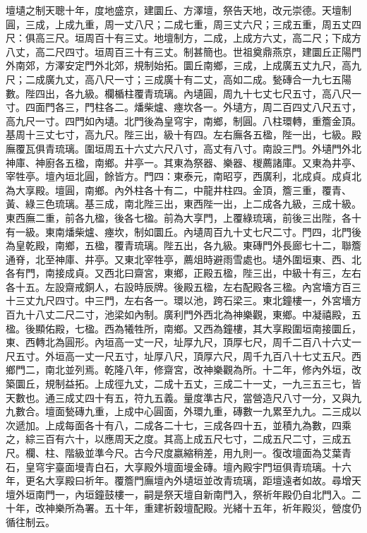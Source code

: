\begin{pinyinscope}
壇壝之制天聰十年，度地盛京，建圜丘、方澤壇，祭告天地，改元崇德。天壇制圓，三成，上成九重，周一丈八尺；二成七重，周三丈六尺；三成五重，周五丈四尺：俱高三尺。垣周百十有三丈。地壇制方，二成，上成方六丈，高二尺；下成方八丈，高二尺四寸。垣周百三十有三丈。制甚簡也。世祖奠鼎燕京，建圜丘正陽門外南郊，方澤安定門外北郊，規制始拓。圜丘南鄉，三成，上成廣五丈九尺，高九尺；二成廣九丈，高八尺一寸；三成廣十有二丈，高如二成。甃磚合一九七五陽數。陛四出，各九級。欄楯柱覆青琉璃。內壝圓，周九十七丈七尺五寸，高八尺一寸。四面門各三，門柱各二。燔柴爐、瘞坎各一。外壝方，周二百四丈八尺五寸，高九尺一寸。四門如內壝。北門後為皇穹宇，南鄉，制圓。八柱環轉，重簷金頂。基周十三丈七寸，高九尺。陛三出，級十有四。左右廡各五楹，陛一出，七級。殿廡覆瓦俱青琉璃。圍垣周五十六丈六尺八寸，高丈有八寸。南設三門。外壝門外北神庫、神廚各五楹，南鄉。井亭一。其東為祭器、樂器、椶薦諸庫。又東為井亭、宰牲亭。壇內垣北圓，餘皆方。門四：東泰元，南昭亨，西廣利，北成貞。成貞北為大享殿。壇圓，南鄉。內外柱各十有二，中龍井柱四。金頂，簷三重，覆青、黃、綠三色琉璃。基三成，南北陛三出，東西陛一出，上二成各九級，三成十級。東西廡二重，前各九楹，後各七楹。前為大享門，上覆綠琉璃，前後三出陛，各十有一級。東南燔柴爐、瘞坎，制如圜丘。內壝周百九十丈七尺二寸。門四，北門後為皇乾殿，南鄉，五楹，覆青琉璃。陛五出，各九級。東磚門外長廊七十二，聯簷通脊，北至神庫、井亭。又東北宰牲亭，薦俎時避雨雪處也。壝外圍垣東、西、北各有門，南接成貞。又西北曰齋宮，東鄉，正殿五楹，陛三出，中級十有三，左右各十五。左設齋戒銅人，右設時辰牌。後殿五楹，左右配殿各三楹。內宮墻方百三十三丈九尺四寸。中三門，左右各一。環以池，跨石梁三。東北鐘樓一，外宮墻方百九十八丈二尺二寸，池梁如內制。廣利門外西北為神樂觀，東鄉。中凝禧殿，五楹。後顯佑殿，七楹。西為犧牲所，南鄉。又西為鐘樓，其大享殿圍垣南接圜丘，東、西轉北為圓形。內垣高一丈一尺，址厚九尺，頂厚七尺，周千二百八十六丈一尺五寸。外垣高一丈一尺五寸，址厚八尺，頂厚六尺，周千九百八十七丈五尺。西鄉門二，南北並列焉。乾隆八年，修齋宮，改神樂觀為所。十二年，修內外垣，改築圜丘，規制益拓。上成徑九丈，二成十五丈，三成二十一丈，一九三五三七，皆天數也。通三成丈四十有五，符九五義。量度準古尺，當營造尺八寸一分，又與九九數合。壇面甃磚九重，上成中心圓面，外環九重，磚數一九累至九九。二三成以次遞加。上成每面各十有八，二成各二十七，三成各四十五，並積九為數，四乘之，綜三百有六十，以應周天之度。其高上成五尺七寸，二成五尺二寸，三成五尺。欄、柱、階級並準今尺。古今尺度嬴縮稍差，用九則一。復改壇面為艾葉青石，皇穹宇臺面墁青白石，大享殿外壇面墁金磚。壇內殿宇門垣俱青琉璃。十六年，更名大享殿曰祈年。覆簷門廡壇內外壝垣並改青琉璃，距壇遠者如故。尋增天壇外垣南門一，內垣鐘鼓樓一，嗣是祭天壇自新南門入，祭祈年殿仍自北門入。二十年，改神樂所為署。五十年，重建祈穀壇配殿。光緒十五年，祈年殿災，營度仍循往制云。


\end{pinyinscope}
